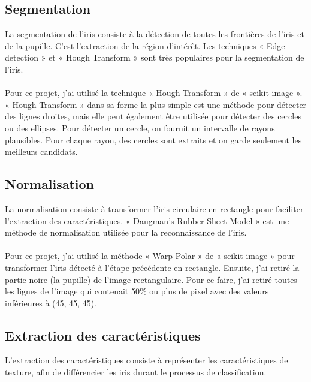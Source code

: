 \documentclass[12pt,twoside,letterpaper]{article}
\begin{document}
\subsection{Segmentation}
La segmentation de l’iris consiste à la détection de toutes les frontières de l’iris et de la pupille. C’est l’extraction de la région d’intérêt. Les techniques « Edge detection » et « Hough Transform » sont très populaires pour la segmentation de l’iris. 
\\~\\
Pour ce projet, j'ai utilisé la technique « Hough Transform » de « scikit-image ». « Hough Transform » dans sa forme la plus simple est une méthode pour détecter des lignes droites, mais elle peut également être utilisée pour détecter des cercles ou des ellipses. Pour détecter un cercle, on fournit un intervalle de rayons plausibles. Pour chaque rayon, des cercles sont extraits et on garde seulement les meilleurs candidats.\cite{ref_04}

\subsection{Normalisation}
La normalisation consiste à transformer l’iris circulaire en rectangle pour faciliter l’extraction des caractéristiques. « Daugman’s Rubber Sheet Model » est une méthode de normalisation utilisée pour la reconnaissance de l’iris.\cite{ref_01}\cite{ref_06}
\\~\\
Pour ce projet, j'ai utilisé la méthode « Warp Polar » de « scikit-image » pour transformer l'iris détecté à l'étape précédente en rectangle. Ensuite, j'ai retiré la partie noire (la pupille) de l'image rectangulaire. Pour ce faire, j'ai retiré toutes les lignes de l'image qui contenait 50\% ou plus de pixel avec des valeurs inférieures à (45, 45, 45).

\subsection{Extraction des caractéristiques}
L’extraction des caractéristiques consiste à représenter les caractéristiques de texture, afin de différencier les iris durant le processus de classification.\cite{ref_01}\cite{ref_06}
\end{document}
